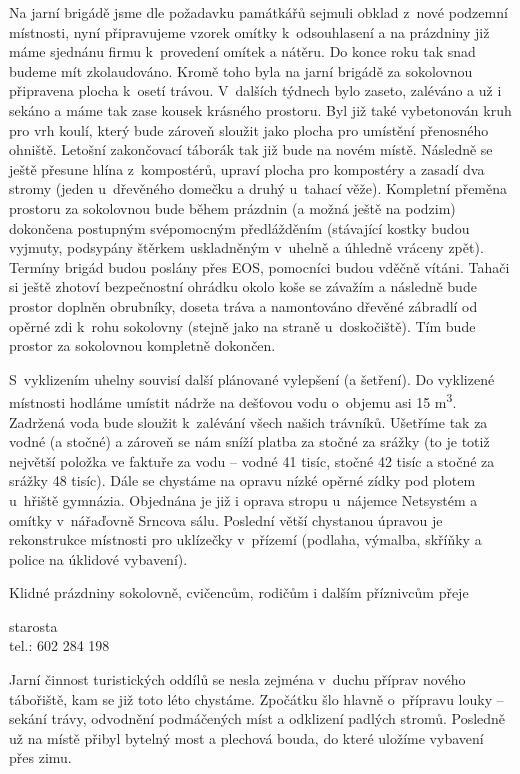 \documentclass[11pt]{article}
\begin{document}
Na jarní brigádě jsme dle požadavku památkářů sejmuli obklad z~nové
podzemní
místnosti, nyní připravujeme vzorek omítky k~odsouhlasení a na prázdniny
již
máme sjednánu firmu k~provedení omítek a nátěru. Do konce roku tak snad
budeme mít zkolaudováno.
Kromě toho byla na jarní brigádě za sokolovnou připravena plocha k~osetí
trávou.
V~dalších týdnech bylo zaseto, zaléváno a už i sekáno a máme tak zase
kousek
krásného prostoru. Byl již také vybetonován kruh pro vrh koulí, který
bude zároveň
sloužit jako plocha pro umístění přenosného ohniště. Letošní zakončovací
táborák
tak již bude na novém místě. Následně se ještě přesune hlína
z~kompostérů, upraví
plocha pro kompostéry a zasadí dva stromy (jeden u~dřevěného domečku a
druhý
u~tahací věže). Kompletní přeměna prostoru za sokolovnou bude během
prázdnin (a
možná ještě na podzim) dokončena postupným svépomocným předlážděním
(stávající kostky budou vyjmuty, podsypány štěrkem uskladněným v~uhelně
a
úhledně vráceny zpět). Termíny brigád budou poslány přes EOS, pomocníci
budou vděčně vítáni. Tahači si ještě zhotoví bezpečnostní ohrádku okolo
koše se závažím a následně bude prostor doplněn obrubníky, doseta tráva
a namontováno dřevěné zábradlí od opěrné zdi k~rohu sokolovny (stejně
jako na straně u~doskočiště). Tím bude prostor za
sokolovnou kompletně dokončen.

S~vyklizením uhelny souvisí další plánované vylepšení (a šetření). Do
vyklizené
místnosti hodláme umístit nádrže na dešťovou vodu o~objemu asi 15
m\textsuperscript{3}. Zadržená
voda bude sloužit k~zalévání všech našich trávníků. Ušetříme tak za
vodné (a stočné)
a zároveň se nám sníží platba za stočné za srážky (to je totiž největší
položka ve
faktuře za vodu -- vodné 41 tisíc, stočné 42 tisíc a stočné za srážky 48
tisíc).
Dále se chystáme na opravu nízké opěrné zídky pod plotem u~hřiště
gymnázia.
Objednána je již i oprava stropu u~nájemce Netsystém a omítky
v~nářaďovně Srncova
sálu. Poslední větší chystanou úpravou je rekonstrukce místnosti pro
uklízečky
v~přízemí (podlaha, výmalba, skříňky a police na úklidové vybavení).

Klidné prázdniny sokolovně, cvičencům, rodičům i dalším příznivcům přeje

\signature{Jiří Novák (Jirkan)}{starosta\\tel.: 602 284 198}

\vspace*{24pt}

Jarní činnost turistických oddílů se nesla zejména v~duchu příprav
nového tábořiště, kam se již toto léto chystáme. Zpočátku šlo hlavně
o~přípravu louky --⁠⁠⁠⁠⁠⁠ sekání trávy, odvodnění podmáčených míst a odklizení
padlých stromů. Posledně už na místě přibyl bytelný most a plechová
bouda, do které uložíme vybavení přes zimu.
\end{document}
